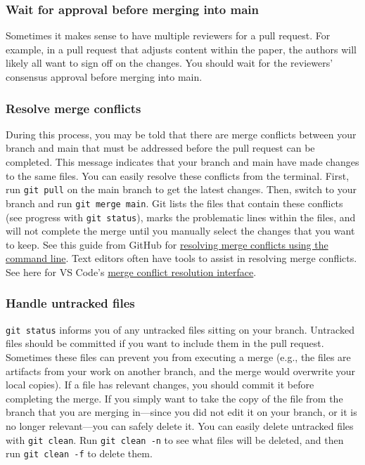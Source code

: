 \subsubsection{Wait for approval before merging into main}
Sometimes it makes sense to have multiple reviewers for a pull request.
For example, in a pull request that adjusts content within the paper,
the authors will likely all want to sign off on the changes.
You should wait for the reviewers' consensus approval before merging into main.

\subsubsection{Resolve merge conflicts}
During this process, you may be told that there are merge conflicts between
your branch and main that must be addressed before the pull request can be completed.
This message indicates that your branch and main have made changes to the same files.
You can easily resolve these conflicts from the terminal.
First, run \texttt{git pull} on the main branch to get the latest changes.
Then, switch to your branch and run \texttt{git merge main}.
Git lists the files that contain these conflicts
(see progress with \texttt{git status}), marks the problematic lines within the files,
and will not complete the merge until you manually
select the changes that you want to keep.
See this guide from GitHub for
\href{https://help.github.com/articles/resolving-a-merge-conflict-using-the-command-line/}{resolving merge conflicts using the command line}.
Text editors often have tools to assist in resolving merge conflicts.
See here for VS Code's \href{https://code.visualstudio.com/docs/editor/versioncontrol#_merge-conflicts}{merge conflict resolution interface}.

\subsubsection{Handle untracked files}
\texttt{git status} informs you of any untracked files sitting on your branch.
Untracked files should be committed if you want to include them in the pull request.
Sometimes these files can prevent you from executing a merge
(e.g., the files are artifacts from your work on another branch, and
the merge would overwrite your local copies).
If a file has relevant changes, you should commit it before completing the merge.
If you simply want to take the copy of the file from the branch that you are merging
in---since you did not edit it on your branch, or it is no longer relevant---you
can safely delete it.
You can easily delete untracked files with \texttt{git clean}.
Run \texttt{git clean -n} to see what files will be deleted,
and then run \texttt{git clean -f} to delete them.

